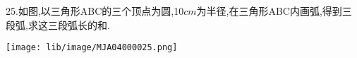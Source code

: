 25.如图,以三角形ABC的三个顶点为圆,10$cm$为半径,在三角形ABC内画弧,得到三段弧,求这三段弧长的和.

\begin{flushright}

    \texttt{[image: lib/image/MJA04000025.png]}

\end{flushright}



